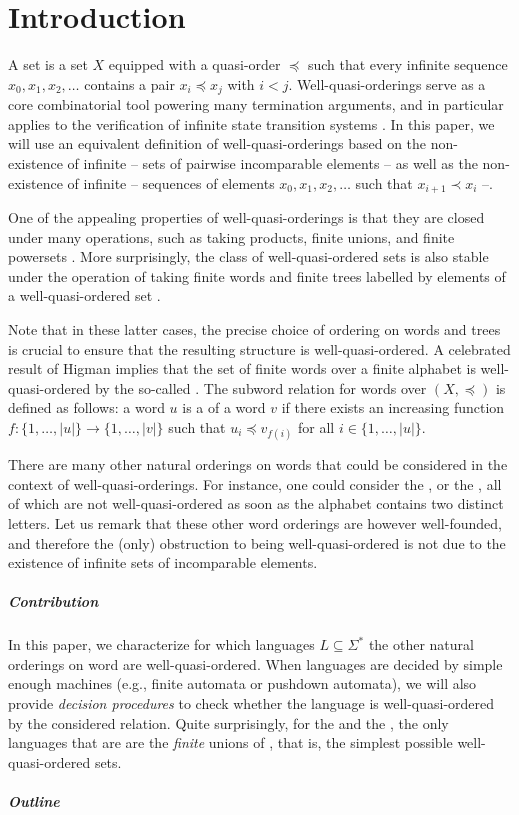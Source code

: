 \section{Introduction}
\label{introduction:sec}

A  set is a set $X$ equipped with a quasi-order
$\preceq$ such that every infinite sequence $x_0, x_1, x_2 , \ldots$ contains a
pair $x_i \preceq x_j$ with $i < j$. Well-quasi-orderings serve as a core
combinatorial tool powering many termination arguments, and in particular
applies to the verification of infinite state transition systems
\cite{ABDU96,ABDU98}. 
In this paper, we will use an equivalent definition of
well-quasi-orderings based on the non-existence of infinite 
-- sets of pairwise incomparable elements -- as well as the non-existence of
infinite  -- sequences of elements $x_0, x_1, x_2,
\ldots$ such that $x_{i+1} \prec x_{i}$ --. 


One of the appealing properties of well-quasi-orderings is that they are closed
under many operations, such as taking products, finite unions, and finite
powersets \cite{SCSC12}. More surprisingly, the class of well-quasi-ordered
sets is also stable under the operation of taking finite words and finite trees
labelled by elements of a well-quasi-ordered set \cite{HIG52,KRU72}. 

Note that in these latter cases, the precise choice of ordering on words and
trees is crucial to ensure that the resulting structure is well-quasi-ordered.
A celebrated result of Higman implies that the set of finite words over a
finite alphabet is well-quasi-ordered by the so-called 
\cite{HIG52}. The subword relation for words over $(X, \preceq)$ is defined as
follows: a word $u$ is a  of a word $v$ if there exists an
increasing function $f \colon \{1, \ldots, |u|\} \to \{1, \ldots, |v|\}$ such
that $u_i \preceq v_{f(i)}$ for all $i \in \{1, \ldots, |u|\}$.

There are many other natural orderings on words that could be considered in the
context of well-quasi-orderings. For instance, one could consider the
,  or the , all of
which are not well-quasi-ordered as soon as the alphabet contains two distinct
letters. Let us remark that these other word orderings are however
well-founded, and therefore the (only) obstruction to being well-quasi-ordered
is not due to the existence of infinite sets of incomparable elements.


\subparagraph{Contribution} In this paper, we characterize for which languages
$L \subseteq \Sigma^*$ the other natural orderings on word are
well-quasi-ordered. When languages are decided by simple enough machines (e.g.,
finite automata or pushdown automata), we will also provide \emph{decision
procedures} to check whether the language is well-quasi-ordered by the
considered relation. Quite surprisingly, for the  and the
, the only languages that are  are
the \emph{finite} unions of , that is, the simplest possible
well-quasi-ordered sets. 

\subparagraph{Outline}

